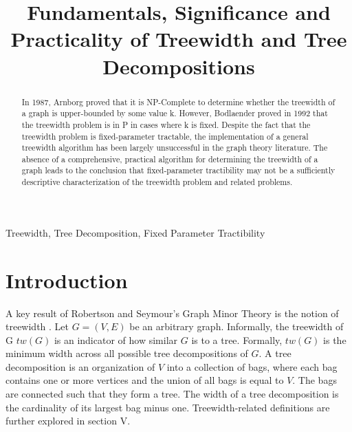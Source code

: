\documentclass[12pt,conference]{IEEEtran}
\begin{document}
\raggedbottom

\title{Fundamentals, Significance and Practicality of Treewidth and Tree Decompositions}

\author{
}

\maketitle

\begin{abstract}
In 1987, Arnborg proved that it is NP-Complete to determine whether the treewidth of a graph is upper-bounded by some value k. However, Bodlaender proved in 1992 that the treewidth problem is in P in cases where k is fixed. Despite the fact that the treewidth problem is fixed-parameter tractable, the implementation of a general treewidth algorithm has been largely unsuccessful in the graph theory literature. The absence of a comprehensive, practical algorithm for determining the treewidth of a graph leads to the conclusion that fixed-parameter tractibility may not be a sufficiently descriptive characterization of the treewidth problem and related problems.
\end{abstract}

\begin{IEEEkeywords}
Treewidth, Tree Decomposition, Fixed Parameter Tractibility
\end{IEEEkeywords}

\IEEEpeerreviewmaketitle

\section{Introduction}
A key result of Robertson and Seymour's Graph Minor Theory is the notion of treewidth \cite{treewidth-rob-seymour}. Let $G = (V,E)$ be an arbitrary graph. Informally, the treewidth of G $tw(G)$ is an indicator of how similar $G$ is to a tree. Formally, $tw(G)$ is the minimum width across all possible tree decompositions of $G$. A tree decomposition is an organization of $V$ into a collection of bags, where each bag contains one or more vertices and the union of all bags is equal to $V$. The bags are connected such that they form a tree. The width of a tree decomposition is the cardinality of its largest bag minus one. Treewidth-related definitions are further explored in section V.
\end{document}
